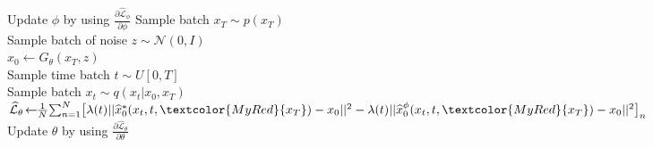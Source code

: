 \begin{algorithm}[h]
{{            Update $\phi$ by using $\frac{\partial \widehat{\mathcal{L}}_{\phi}}{\partial \phi}$
        }
        Sample batch $x_T \sim p(x_T)$ \\
        Sample batch of noise $z \sim \mathcal{N}(0, I)$ \\
        $x_0 \leftarrow G_{\theta}(x_T, z)$ \\
        Sample time batch $t \sim U[0, T]$ \\
        Sample batch $x_t \sim q(x_t|x_0, x_T)$ \\
        $\widehat{\mathcal{L}}_{\theta} \! \leftarrow \!\! \frac{1}{N}\! \sum_{n=1}^N \! \big[\lambda(t)||\widehat{x}_0^{*}(x_t, t, \textcolor{MyRed}{x_T}) -  x_0||^2 - \\ 
        \lambda(t)||\widehat{x}_0^{\phi}(x_t, t, \textcolor{MyRed}{x_T})  - x_0||^2 \big]_{n}$ \\
        Update $\theta$ by using $\frac{\partial \widehat{\mathcal{L}}_{\theta}}{\partial \theta}$
    }
\end{algorithm}

\vspace{-2mm}